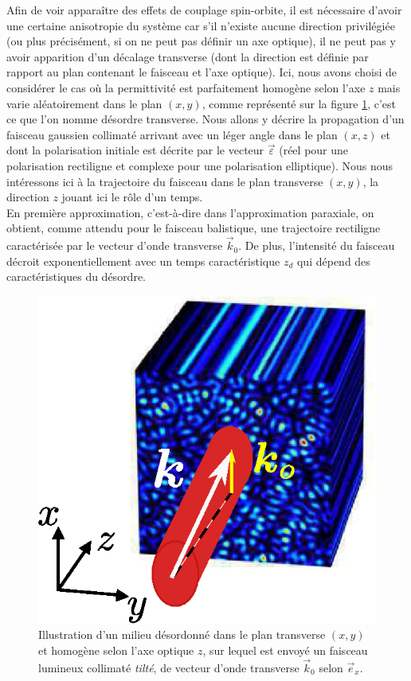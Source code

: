 \documentclass[a4paper,11pt]{article} %
\begin{document}
	Afin de voir apparaître des effets de couplage spin-orbite, il est nécessaire d'avoir une certaine anisotropie du système car s'il n'existe aucune direction privilégiée (ou plus précisément, si on ne peut pas définir un axe optique), il ne peut pas y avoir apparition d'un décalage transverse (dont la direction est définie par rapport au plan contenant le faisceau et l'axe optique). Ici, nous avons choisi de considérer le cas où la permittivité est parfaitement homogène selon l'axe $ z $ mais varie aléatoirement dans le plan $ (x,y) $, comme représenté sur la figure \ref{fig:systeme_desordre_transverse}, c'est ce que l'on nomme désordre transverse. Nous allons y décrire la propagation d'un faisceau gaussien collimaté arrivant avec un léger angle dans le plan $ (x,z) $ et dont la polarisation initiale est décrite par le vecteur $ \vec{\varepsilon} $ (réel pour une polarisation rectiligne et complexe pour une polarisation elliptique).	Nous nous intéressons ici à la trajectoire du faisceau dans le plan transverse $ (x,y) $, la direction $ z $ jouant ici le rôle d'un temps.\\
	
	En première approximation, c'est-à-dire dans l'approximation paraxiale, on obtient, comme attendu pour le faisceau balistique, une trajectoire rectiligne caractérisée par le vecteur d'onde transverse $ \vec{k}_0 $. De plus, l'intensité du faisceau décroit exponentiellement avec un temps caractéristique $ z_d $ qui dépend des caractéristiques du désordre.\\
	
	
	\begin{figure}[h]
		\centering
		\begin{minipage}[c]{0.85\linewidth}
			\centering
			\includegraphics[width=0.35\linewidth]{./Illustrations/2+1disorder.eps}
			\caption{Illustration d'un milieu désordonné dans le plan transverse $ (x,y) $ et homogène selon l'axe optique $ z $, sur lequel est envoyé un faisceau lumineux collimaté \textit{tilté}, de vecteur d'onde transverse $ \vec{k}_0 $ selon $ \vec{e}_x $.}
			\label{fig:systeme_desordre_transverse}
		\end{minipage}
	\end{figure}
	
\end{document}
